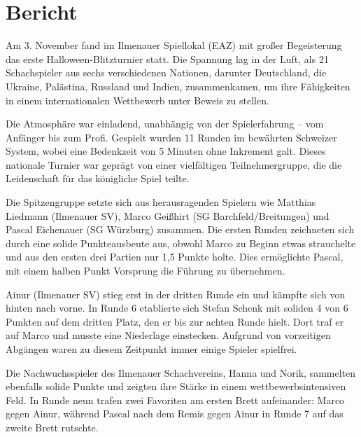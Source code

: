 \documentclass[a4paper,ngerman]{tui-algo-seminar}
\title{\content}
\author{Erik Skopp}
\begin{document}
	
	\maketitle
\thispagestyle{plain} %

\begin{abstract}


. 
\end{abstract}

\section{Bericht}

Am 3. November fand im Ilmenauer Spiellokal (EAZ) mit großer Begeisterung das erste Halloween-Blitzturnier statt. Die Spannung lag in der Luft, als 21 Schachspieler aus sechs verschiedenen Nationen, darunter Deutschland, die Ukraine, Palästina, Russland und Indien, zusammenkamen, um ihre Fähigkeiten in einem internationalen Wettbewerb unter Beweis zu stellen.

Die Atmosphäre war einladend, unabhängig von der Spielerfahrung – vom Anfänger bis zum Profi. Gespielt wurden 11 Runden im bewährten Schweizer System, wobei eine Bedenkzeit von 5 Minuten ohne Inkrement galt. Dieses nationale Turnier war geprägt von einer vielfältigen Teilnehmergruppe, die die Leidenschaft für das königliche Spiel teilte.

Die Spitzengruppe setzte sich aus herausragenden Spielern wie Matthias Liedmann (Ilmenauer SV), Marco Geißhirt (SG Barchfeld/Breitungen) und Pascal Eichenauer (SG Würzburg) zusammen. Die ersten Runden zeichneten sich durch eine solide Punkteausbeute aus, obwohl Marco zu Beginn etwas strauchelte und aus den ersten drei Partien nur 1,5 Punkte holte. Dies ermöglichte Pascal, mit einem halben Punkt Vorsprung die Führung zu übernehmen.

Ainur (Ilmenauer SV) stieg erst in der dritten Runde ein und kämpfte sich von hinten nach vorne. In Runde 6 etablierte sich Stefan Schenk mit soliden 4 von 6 Punkten auf dem dritten Platz, den er bis zur achten Runde hielt. Dort traf er auf Marco und musste eine Niederlage einstecken. Aufgrund von vorzeitigen Abgängen waren zu diesem Zeitpunkt immer einige Spieler spielfrei.

Die Nachwuchsspieler des Ilmenauer Schachvereins, Hanna und Norik, sammelten ebenfalls solide Punkte und zeigten ihre Stärke in einem wettbewerbsintensiven Feld. In Runde neun trafen zwei Favoriten am ersten Brett aufeinander: Marco gegen Ainur, während Pascal nach dem Remis gegen Ainur in Runde 7 auf das zweite Brett rutschte.
\end{document}
